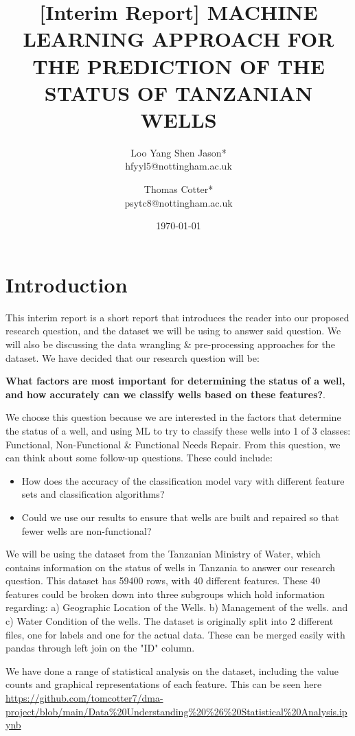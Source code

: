 \documentclass[twocolumn]{article}
\title{[Interim Report] MACHINE LEARNING APPROACH FOR THE PREDICTION OF THE STATUS OF TANZANIAN WELLS}
\author{Loo Yang Shen Jason*\\
        hfyyl5@nottingham.ac.uk \and Thomas Cotter*\\
        psytc8@nottingham.ac.uk}
\date{\today}
\begin{document}
    
\maketitle

\section{Introduction}
\label{sec:intro}
This interim report is a short report that introduces the reader into our proposed research question, and the dataset we will be using to answer said question. We will also be discussing the data wrangling \& pre-processing approaches for the dataset. We have decided that our research question will be: 

\textbf{What factors are most important for determining the status of a well, and how accurately can we classify wells based on these features?}. 

We choose this question because we are interested in the factors that determine the status of a well, and using ML to try to classify these wells into 1 of 3 classes: Functional, Non-Functional \& Functional Needs Repair. From this question, we can think about some follow-up questions. These could include:
    \begin{itemize}
        \item How does the accuracy of the classification model vary with different feature sets and classification algorithms?
        \item Could we use our results to ensure that wells are built and repaired so that fewer wells are non-functional?
    \end{itemize}
 
We will be using the dataset from the Tanzanian Ministry of Water, which contains information on the status of wells in Tanzania to answer our research question. This dataset has 59400 rows, with 40 different features. These 40 features could be broken down into three subgroups which hold information regarding: a) Geographic Location of the Wells. b) Management of the wells. and c) Water Condition of the wells. The dataset is originally split into 2 different files, one for labels and one for the actual data. These can be merged easily with pandas through left join on the "ID" column. 



We have done a range of statistical analysis on the dataset, including the value counts and graphical representations of each feature. This can be seen here \url{https://github.com/tomcotter7/dma-project/blob/main/Data%20Understanding%20%26%20Statistical%20Analysis.ipynb}
\end{document}
